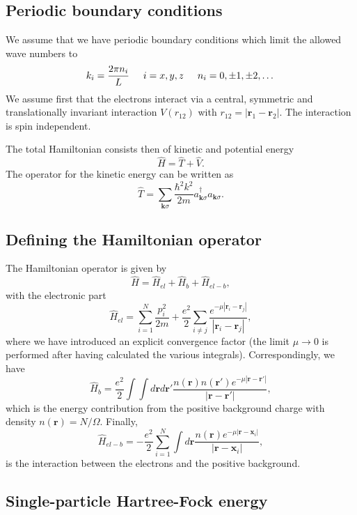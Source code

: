 \documentclass[%
oneside,                 %
final,                   %
10pt]{article}
\begin{document}
\subsection{Periodic boundary conditions}


We assume that we have periodic boundary conditions which limit the allowed wave numbers to
\[
k_i=\frac{2\pi n_i}{L}\hspace{0.5cm} i=x,y,z \hspace{0.5cm} n_i=0,\pm 1,\pm 2, \dots
\]
We assume first that the electrons interact via a central, symmetric and translationally invariant
interaction  $V(r_{12})$ with
$r_{12}=|\mathbf{r}_1-\mathbf{r}_2|$.  The interaction is spin independent.

The total Hamiltonian consists then of kinetic and potential energy
\[
\hat{H} = \hat{T}+\hat{V}.
\]
The operator for the kinetic energy can be written as
\[
\hat{T}=\sum_{\mathbf{k}\sigma}\frac{\hbar^2k^2}{2m}a_{\mathbf{k}\sigma}^{\dagger}a_{\mathbf{k}\sigma}.
\]



\subsection{Defining the Hamiltonian operator}

The Hamiltonian operator is given by
\[
\hat{H}=\hat{H}_{el}+\hat{H}_{b}+\hat{H}_{el-b},
\]
with the electronic part
\[
\hat{H}_{el}=\sum_{i=1}^N\frac{p_i^2}{2m}+\frac{e^2}{2}\sum_{i\ne j}\frac{e^{-\mu |\mathbf{r}_i-\mathbf{r}_j|}}{|\mathbf{r}_i-\mathbf{r}_j|},
\]
where we have introduced an explicit convergence factor
(the limit $\mu\rightarrow 0$ is performed after having calculated the various integrals).
Correspondingly, we have
\[
\hat{H}_{b}=\frac{e^2}{2}\int\int d\mathbf{r}d\mathbf{r}'\frac{n(\mathbf{r})n(\mathbf{r}')e^{-\mu |\mathbf{r}-\mathbf{r}'|}}{|\mathbf{r}-\mathbf{r}'|},
\]
which is the energy contribution from the positive background charge with density
$n(\mathbf{r})=N/\Omega$. Finally,
\[
\hat{H}_{el-b}=-\frac{e^2}{2}\sum_{i=1}^N\int d\mathbf{r}\frac{n(\mathbf{r})e^{-\mu |\mathbf{r}-\mathbf{x}_i|}}{|\mathbf{r}-\mathbf{x}_i|},
\]
is the interaction between the electrons and the positive background.



\subsection{Single-particle Hartree-Fock energy}
\end{document}
